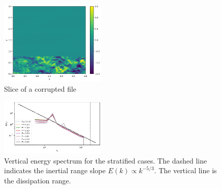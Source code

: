 \documentclass[final,5p,times,twocolumn,authoryear]{elsarticle}
\begin{document}
\begin{figure}[h]
	\centering
	\includegraphics[width=0.45\textwidth]{fig/corrupt_slice.png}
	\caption{Slice of a corrupted file} 
	\label{fig:corrupt}
\end{figure}



\begin{figure}[h]
\centering
\includegraphics[width=0.45\textwidth]{fig/multi_Ekz_kz.png}
\caption{Vertical energy spectrum for the stratified cases. The dashed line indicates the inertial range slope $E(k) \propto k^{-5/3}$. The vertical line is the dissipation range.}
\label{fig:multi vertical spectrum}
\end{figure}
\end{document}
